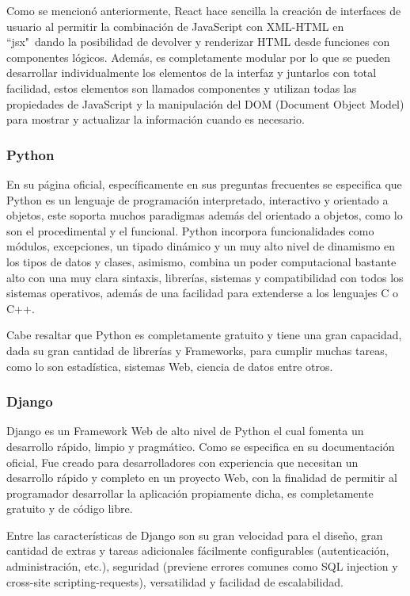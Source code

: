 Como se mencionó anteriormente, React hace sencilla la creación de interfaces
de usuario al permitir la combinación de JavaScript con XML-HTML en ``jsx"\  dando
la posibilidad de devolver y renderizar HTML desde funciones con componentes
lógicos. Además, es completamente modular por lo que se pueden desarrollar
individualmente los elementos de la interfaz y juntarlos con total facilidad,
estos elementos son llamados componentes y utilizan todas las propiedades de
JavaScript y la manipulación del DOM (Document Object Model) para mostrar
y actualizar la información cuando es necesario.


\subsubsection{Python}

En su página oficial, específicamente en sus preguntas frecuentes
\textcite{pythonDocs} se especifica que Python es un lenguaje de programación
interpretado, interactivo y orientado a objetos, este soporta muchos paradigmas
además del orientado a objetos, como lo son el procedimental y el funcional.
Python incorpora funcionalidades como módulos, excepciones, un tipado dinámico
y un muy alto nivel de dinamismo en los tipos de datos y clases, asimismo,
combina un poder computacional bastante alto con una muy clara sintaxis,
librerías, sistemas y compatibilidad con todos los sistemas operativos, además
de una facilidad para extenderse a los lenguajes C o C++.

Cabe resaltar que Python es completamente gratuito y tiene una gran capacidad,
dada su gran cantidad de librerías y Frameworks, para cumplir muchas tareas,
como lo son estadística, sistemas Web, ciencia de datos entre otros.

\subsubsection{Django}

Django es un Framework Web de alto nivel de Python el cual fomenta un
desarrollo rápido, limpio y pragmático. Como se especifica en su documentación
oficial,
\textcite{DjangoDoc} Fue creado para desarrolladores con experiencia que necesitan
un desarrollo rápido y completo en un proyecto Web, con la finalidad de
permitir al programador desarrollar la aplicación propiamente dicha, es
completamente gratuito y de código libre.

Entre las características de Django son su gran velocidad para el diseño, gran
cantidad de extras y tareas adicionales fácilmente configurables
(autenticación, administración, etc.), seguridad (previene errores comunes
como SQL injection y  cross-site scripting-requests), versatilidad y facilidad
de escalabilidad.

